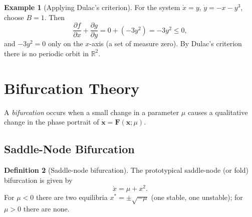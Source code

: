 \documentclass[12pt,a4paper,openany]{book}
\theoremstyle{definition}
\newtheorem{definition}{Definition}[chapter]
\newtheorem{example}[definition]{Example}
\theoremstyle{plain}
\theoremstyle{remark}
\newcommand{\R}{\mathbb{R}}
\begin{document}
\begin{example}[Applying Dulac's criterion]
\label{ex:dulac-application}
For the system $\dot{x}=y$, $\dot{y}=-x-y^3$, choose $B=1$. Then
\[
  \frac{\partial f}{\partial x}+\frac{\partial g}{\partial y}
  = 0 + (-3y^{2}) = -3y^{2} \le 0,
\]
and $-3y^{2}=0$ only on the $x$-axis (a set of measure zero).
By Dulac's criterion there is no periodic orbit in $\R^{2}$.
\end{example}

\section{Bifurcation Theory}
\label{sec:bifurcations}

A \emph{bifurcation} occurs when a
small change in a parameter $\mu$ causes a qualitative change in the
phase portrait of $\dot{\mathbf{x}}=\mathbf{F}(\mathbf{x};\mu)$.

\subsection{Saddle-Node Bifurcation}
\label{subsec:saddle-node}

\begin{definition}[Saddle-node bifurcation]
\label{def:saddle-node}
The prototypical saddle-node (or fold) bifurcation is given by
\[
  \dot{x} = \mu + x^{2}.
\]
For $\mu<0$ there are two equilibria $x^{*}=\pm\sqrt{-\mu}$ (one
stable, one unstable); for $\mu>0$ there are none.
\end{definition}

\begin{center}
\end{center}
\end{document}
